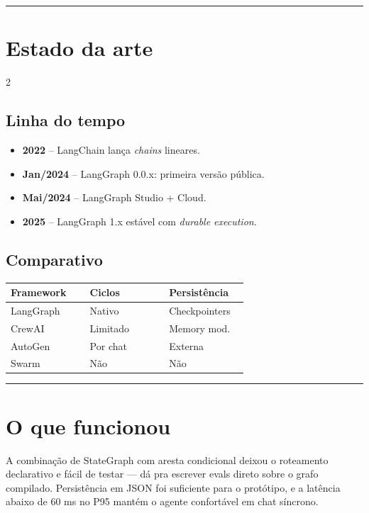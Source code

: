 \documentclass[a4paper,10pt]{article}
\begin{document}
\vspace{2pt}\hrule\vspace{4pt}

\section*{Estado da arte}

\begin{multicols}{2}

\subsection*{Linha do tempo}
\begin{itemize}
\item \textbf{2022} -- LangChain lança \emph{chains} lineares.
\item \textbf{Jan/2024} -- LangGraph 0.0.x: primeira versão pública.
\item \textbf{Mai/2024} -- LangGraph Studio + Cloud.
\item \textbf{2025} -- LangGraph 1.x estável com \emph{durable execution}.
\end{itemize}

\columnbreak

\subsection*{Comparativo}
\begin{tabular}{@{} p{0.30\linewidth} p{0.30\linewidth} p{0.30\linewidth} @{}}
\toprule
\textbf{Framework} & \textbf{Ciclos} & \textbf{Persistência} \\
\midrule
LangGraph    & Nativo   & Checkpointers \\
CrewAI       & Limitado & Memory mod. \\
AutoGen      & Por chat & Externa \\
Swarm        & Não      & Não \\
\bottomrule
\end{tabular}

\end{multicols}

\vspace{2pt}\hrule\vspace{4pt}

\section*{O que funcionou}
A combinação de StateGraph com aresta condicional deixou o roteamento declarativo e fácil de testar --- dá pra escrever evals direto sobre o grafo compilado. Persistência em JSON foi suficiente para o protótipo, e a latência abaixo de 60 ms no P95 mantém o agente confortável em chat síncrono.
\end{document}
